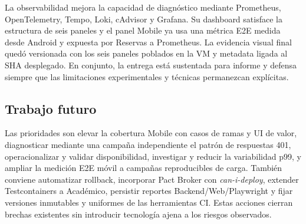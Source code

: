 La observabilidad mejora la capacidad de diagnóstico mediante Prometheus,
OpenTelemetry, Tempo, Loki, cAdvisor y Grafana. Su dashboard satisface la
estructura de seis paneles y el panel Mobile ya usa una métrica E2E medida desde
Android y expuesta por Reservas a Prometheus. La evidencia visual final quedó versionada con los seis paneles poblados en la VM y metadata ligada al SHA desplegado. En conjunto, la entrega está
sustentada para informe y defensa siempre que las limitaciones experimentales y
técnicas permanezcan explícitas.

\subsection{Trabajo futuro}
\label{subsec:trabajo-futuro}

Las prioridades son elevar la cobertura Mobile con casos de ramas y UI de valor,
diagnosticar mediante una campaña independiente el patrón de respuestas 401,
operacionalizar y validar disponibilidad, investigar y reducir la variabilidad
p99, y ampliar la medición E2E móvil a campañas reproducibles de carga.
También conviene automatizar rollback, incorporar Pact
Broker con \emph{can-i-deploy}, extender Testcontainers a Académico, persistir
reportes Backend/Web/Playwright y fijar versiones inmutables y uniformes de las
herramientas CI. Estas acciones cierran brechas existentes sin introducir
tecnología ajena a los riesgos observados.
